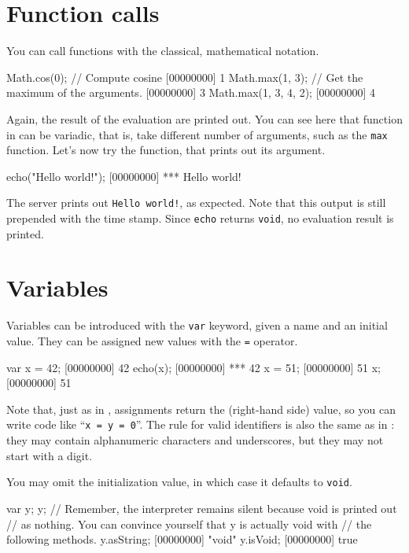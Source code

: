 \section{Function calls}

You can call functions with the classical, mathematical notation.

\begin{urbiscript}
Math.cos(0); // Compute cosine
[00000000] 1
Math.max(1, 3); // Get the maximum of the arguments.
[00000000] 3
Math.max(1, 3, 4, 2);
[00000000] 4
\end{urbiscript}

Again, the result of the evaluation are printed out. You can see here
that function in \us can be variadic, that is, take different number
of arguments, such as the \lstinline{max} function. Let's now try the
 function, that prints out its argument.

\begin{urbiscript}
echo("Hello world!");
[00000000] *** Hello world!
\end{urbiscript}

The server prints out \lstinline{Hello world!}, as expected. Note that this
output is still prepended with the time stamp. Since \lstinline{echo}
returns \lstinline{void}, no evaluation result is printed.

\section{Variables}
Variables can be introduced with the \lstinline{var} keyword, given a
name and an initial value. They can be assigned new values with the
\lstinline{=} operator.

\begin{urbiscript}
var x = 42;
[00000000] 42
echo(x);
[00000000] *** 42
x = 51;
[00000000] 51
x;
[00000000] 51
\end{urbiscript}

Note that, just as in \Cxx, assignments return the (right-hand side) value, so
you can write code like ``\lstinline|x = y = 0|''. The rule for valid
identifiers is also the same as in \Cxx: they may contain alphanumeric
characters and underscores, but they may not start with a digit.

You may omit the initialization value, in which case it defaults to
\lstinline|void|.

\begin{urbiscript}
var y;
y;
// Remember, the interpreter remains silent because void is printed out
// as nothing.  You can convince yourself that y is actually void with
// the following methods.
y.asString;
[00000000] "void"
y.isVoid;
[00000000] true
\end{urbiscript}

